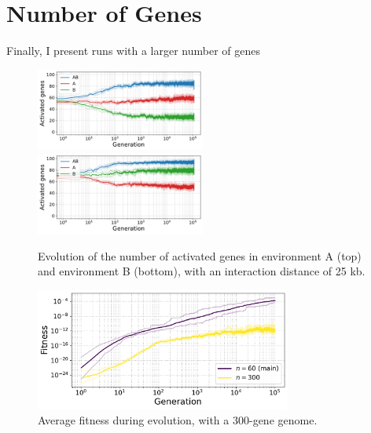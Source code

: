 \FloatBlock

\section{Number of Genes}

Finally, I present runs with a larger number of genes


\begin{figure}[H]
\centering
\includegraphics[width=0.495\textwidth]{param/300-genes/gene_activity_env_A.pdf}
\includegraphics[width=0.495\textwidth]{param/300-genes/gene_activity_env_B.pdf}
\caption[Evolution of the number of activated genes in each environment, with a 300-gene genome]{Evolution of the number of activated genes in environment A (top) and environment B (bottom), with an interaction distance of 25 kb.}
\end{figure}

\begin{figure}[H]
\centering
\includegraphics[width=0.75\textwidth]{param/300-genes/fitness_all_with_main.pdf}
\caption[Average fitness during evolution, with a 300-gene genome]{Average fitness during evolution, with a 300-gene genome.}
\end{figure}


